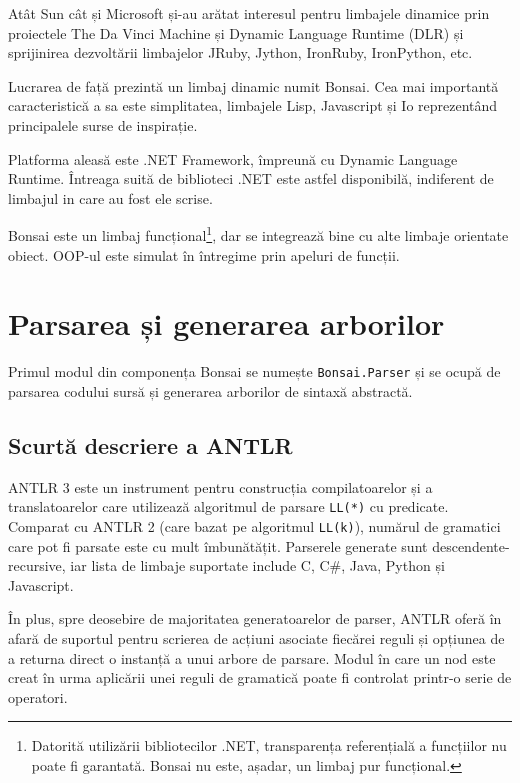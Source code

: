 \documentclass[12pt,a4paper]{memoir}
\renewcommand{\c}{\texttt}
\begin{document}
Atât Sun cât și Microsoft și-au arătat interesul pentru limbajele dinamice prin proiectele The Da Vinci Machine\cite{daVinciMachine} și Dynamic Language Runtime (DLR)\cite{dlr} și sprijinirea dezvoltării limbajelor JRuby\cite{jruby}, Jython\cite{jython}, IronRuby\cite{ironruby}, IronPython\cite{ironpython}, etc.

Lucrarea de față prezintă un limbaj dinamic numit Bonsai. Cea mai importantă caracteristică a sa este simplitatea, limbajele Lisp, Javascript și Io\cite{io} reprezentând principalele surse de inspirație.

Platforma aleasă este .NET Framework, împreună cu Dynamic Language Runtime. Întreaga suită de biblioteci .NET este astfel disponibilă, indiferent de limbajul in care au fost ele scrise. 

Bonsai este un limbaj funcțional\footnote{Datorită utilizării bibliotecilor .NET, transparența referențială a funcțiilor nu poate fi garantată. Bonsai nu este, așadar, un limbaj pur funcțional.}, dar se integrează bine cu alte limbaje orientate obiect. OOP-ul este simulat în întregime prin apeluri de funcții.

\chapter{Parsarea și generarea arborilor}

Primul modul din componența Bonsai se numește \c{Bonsai.Parser} și se ocupă de parsarea codului sursă și generarea arborilor de sintaxă abstractă.

\section{Scurtă descriere a ANTLR}

ANTLR 3\cite{antlr} este un instrument pentru construcția compilatoarelor și a translatoarelor care utilizează algoritmul de parsare \c{LL(*)} cu predicate\cite{definitive_antlr_reference}. Comparat cu ANTLR 2 (care bazat pe algoritmul \c{LL(k)}), numărul de gramatici care pot fi parsate este cu mult îmbunătățit. Parserele generate sunt descendente-recursive, iar lista de limbaje suportate\cite{antlr_targets} include C, C\#, Java, Python și Javascript. 

În plus, spre deosebire de majoritatea generatoarelor de parser, ANTLR oferă în afară de suportul pentru scrierea de acțiuni asociate fiecărei reguli și opțiunea de a returna direct o instanță a unui arbore de parsare. Modul în care un nod este creat în urma aplicării unei reguli de gramatică poate fi controlat printr-o serie de operatori\cite[cap. 7]{definitive_antlr_reference}.
\end{document}
